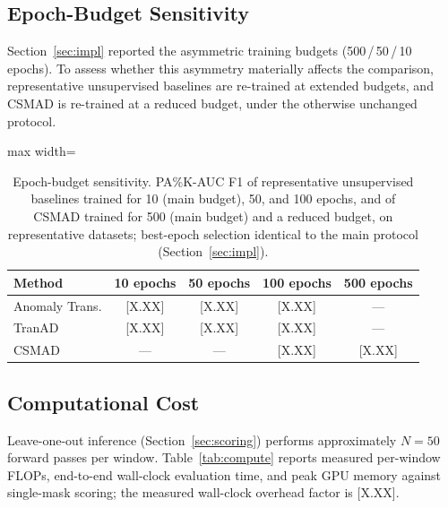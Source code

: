\subsection{Epoch-Budget Sensitivity}
\label{sec:epoch_sensitivity}

Section~\ref{sec:impl} reported the asymmetric training budgets (500\,/\,50\,/\,10 epochs).
To assess whether this asymmetry materially affects the comparison, representative unsupervised
baselines are re-trained at extended budgets, and CSMAD is re-trained at a reduced budget, under
the otherwise unchanged protocol.

\begin{table}[tp]
\footnotesize
\centering
\caption{Epoch-budget sensitivity. PA\%K-AUC F1 of representative unsupervised baselines
  trained for 10 (main budget), 50, and 100 epochs, and of CSMAD trained for 500 (main budget)
  and a reduced budget, on representative datasets; best-epoch selection identical to the main
  protocol (Section~\ref{sec:impl}).}
\label{tab:epoch_sensitivity}
\begin{adjustbox}{max width=\linewidth}
\begin{tabular}{lcccc}
\toprule
Method & 10 epochs & 50 epochs & 100 epochs & 500 epochs \\
\midrule
Anomaly Trans. & {[X.XX]} & {[X.XX]} & {[X.XX]} & --- \\
TranAD         & {[X.XX]} & {[X.XX]} & {[X.XX]} & --- \\
CSMAD          & --- & --- & {[X.XX]} & {[X.XX]} \\
\bottomrule
\end{tabular}
\end{adjustbox}
\end{table}

\subsection{Computational Cost}
\label{sec:cost}

Leave-one-out inference (Section~\ref{sec:scoring}) performs approximately $N=50$ forward passes
per window.
Table~\ref{tab:compute} reports measured per-window FLOPs, end-to-end wall-clock evaluation
time, and peak GPU memory against single-mask scoring; the measured wall-clock overhead factor
is [X.XX].

